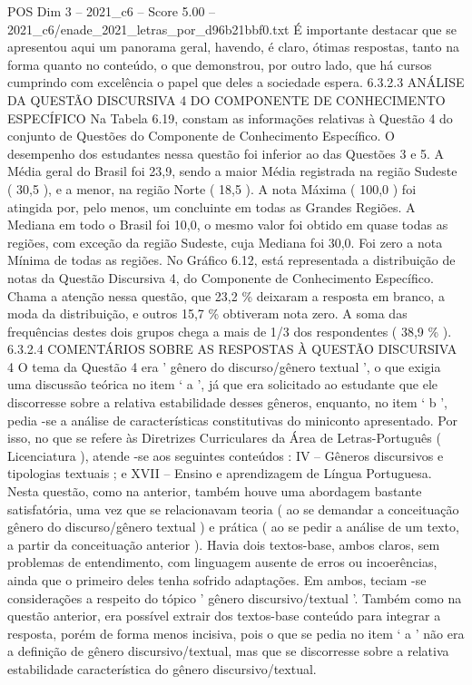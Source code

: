 \begin{textsample}{POS Dim 3 – 2021\_c6 – Score 5.00 – 2021\_c6/enade\_2021\_letras\_por\_d96b21bbf0.txt}
É importante destacar que se apresentou aqui um panorama geral, havendo, é claro, ótimas respostas, tanto na forma quanto no conteúdo, o que demonstrou, por outro lado, que há cursos cumprindo com excelência o papel que deles a sociedade espera. 6.3.2.3 ANÁLISE DA QUESTÃO DISCURSIVA 4 DO COMPONENTE DE CONHECIMENTO ESPECÍFICO Na Tabela 6.19, constam as informações relativas à Questão 4 do conjunto de Questões do Componente de Conhecimento Específico.
O desempenho dos estudantes nessa questão foi inferior ao das Questões 3 e 5.
A Média geral do Brasil foi 23,9, sendo a maior Média registrada na região Sudeste ( 30,5 ), e a menor, na região Norte ( 18,5 ).
A nota Máxima ( 100,0 ) foi atingida por, pelo menos, um concluinte em todas as Grandes Regiões.
A Mediana em todo o Brasil foi 10,0, o mesmo valor foi obtido em quase todas as regiões, com exceção da região Sudeste, cuja Mediana foi 30,0.
Foi zero a nota Mínima de todas as regiões.
No Gráfico 6.12, está representada a distribuição de notas da Questão Discursiva 4, do Componente de Conhecimento Específico.
Chama a atenção nessa questão, que 23,2 \% deixaram a resposta em branco, a moda da distribuição, e outros 15,7 \% obtiveram nota zero.
A soma das frequências destes dois grupos chega a mais de 1/3 dos respondentes ( 38,9 \% ). 6.3.2.4 COMENTÁRIOS SOBRE AS RESPOSTAS À QUESTÃO DISCURSIVA 4 O tema da Questão 4 era ' gênero do discurso/gênero textual ', o que exigia uma discussão teórica no item ‘ a ’, já que era solicitado ao estudante que ele discorresse sobre a relativa estabilidade desses gêneros, enquanto, no item ‘ b ’, pedia -se a análise de características constitutivas do miniconto apresentado.
Por isso, no que se refere às Diretrizes Curriculares da Área de Letras-Português ( Licenciatura ), atende -se aos seguintes conteúdos : IV – Gêneros discursivos e tipologias textuais ; e XVII – Ensino e aprendizagem de Língua Portuguesa.
Nesta questão, como na anterior, também houve uma abordagem bastante satisfatória, uma vez que se relacionavam teoria ( ao se demandar a conceituação gênero do discurso/gênero textual ) e prática ( ao se pedir a análise de um texto, a partir da conceituação anterior ).
Havia dois textos-base, ambos claros, sem problemas de entendimento, com linguagem ausente de erros ou incoerências, ainda que o primeiro deles tenha sofrido adaptações.
Em ambos, teciam -se considerações a respeito do tópico ' gênero discursivo/textual '.
Também como na questão anterior, era possível extrair dos textos-base conteúdo para integrar a resposta, porém de forma menos incisiva, pois o que se pedia no item ‘ a ’ não era a definição de gênero discursivo/textual, mas que se discorresse sobre a relativa estabilidade característica do gênero discursivo/textual.

\end{textsample}
